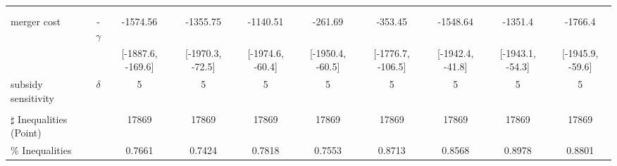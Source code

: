 \begin{tabular}{@{\extracolsep{5pt}}lccccccccc}
 &  &  &  &  &  &  &  &  &  \\
 &  &  &  &  &  &  &  &  &  \\
merger cost & -$\gamma$ & -1574.56 & -1355.75 & -1140.51 & -261.69 & -353.45 & -1548.64 & -1351.4 & -1766.4 \\
 &  & [-1887.6, -169.6] & [-1970.3, -72.5] & [-1974.6, -60.4] & [-1950.4, -60.5] & [-1776.7, -106.5] & [-1942.4, -41.8] & [-1943.1, -54.3] & [-1945.9, -59.6] \\
subsidy sensitivity & $\delta$ & 5 & 5 & 5 & 5 & 5 & 5 & 5 & 5 \\
 &  &  &  &  &  &  &  &  &  \\
\hline 
$\sharp$ Inequalities (Point) &  & 17869 & 17869 & 17869 & 17869 & 17869 & 17869 & 17869 & 17869 \\
\% Inequalities &  & 0.7661 & 0.7424 & 0.7818 & 0.7553 & 0.8713 & 0.8568 & 0.8978 & 0.8801 \\
\bottomrule 
\end{tabular}
